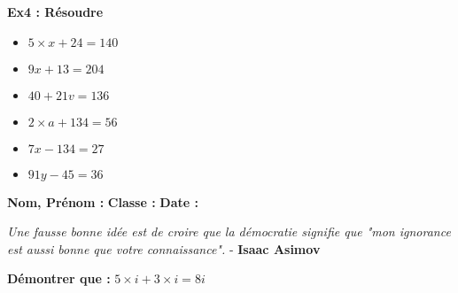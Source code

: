 \textbf{Ex4 : Résoudre} \vspace{-0.4cm}

\begin{multicols}{3}
\begin{itemize}[label={$\bullet$}]
  \item $5 \times x + 24 = 140$ 
  \item $9x + 13 = 204$ \columnbreak 
  \item $40 + 21v = 136$ 
  \item $2 \times a + 134 = 56$ \columnbreak 
  \item $7x - 134 = 27$ 
  \item $91y - 45 = 36$ 
\end{itemize}
\end{multicols}
\Pointilles[24]

\newpage
\textbf{Nom, Prénom :} \hspace{8cm} \textbf{Classe :} \hspace{3cm} \textbf{Date :}\\

\vspace{-0.8cm}

\begin{center}
  \textit{Une fausse bonne idée est de croire que la démocratie signifie que "mon ignorance est aussi bonne que votre connaissance".} - \textbf{Isaac Asimov}
\end{center}

\textbf{Démontrer que :} $5 \times i + 3 \times i = 8i$ \\ \Pointilles[4] 

\vspace{-0.6cm}


